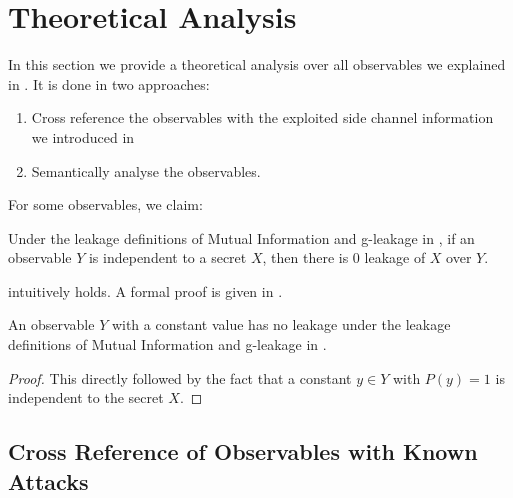 
\section{Theoretical Analysis} \label{Sec: Theoretical Analysis}

In this section we provide a theoretical analysis over all observables we explained in . It is done in two approaches:

\begin{enumerate}
	\item Cross reference the observables with the exploited side channel information we introduced in 
	\item Semantically analyse the observables. 
\end{enumerate}


For some observables, we claim:

\begin{theorem} \label{Te: IR}
Under the leakage definitions of Mutual Information and g-leakage in , if an observable $Y$ is independent to a secret $X$, then there is $0$ leakage of $X$ over $Y$.
\end{theorem}

 intuitively holds. A formal proof is given in .

\begin{corollary} \label{Cor: Constant Leakage}
	An observable $Y$ with a constant value has no leakage under the leakage definitions of  Mutual Information and g-leakage in .
\end{corollary}

\begin{proof}
	This directly followed by the fact that a constant $y \in Y$ with $P(y) = 1$ is independent to the secret $X$.
\end{proof}

\subsection{Cross Reference of Observables with Known Attacks} \label{Subsec: Cross Reference}

